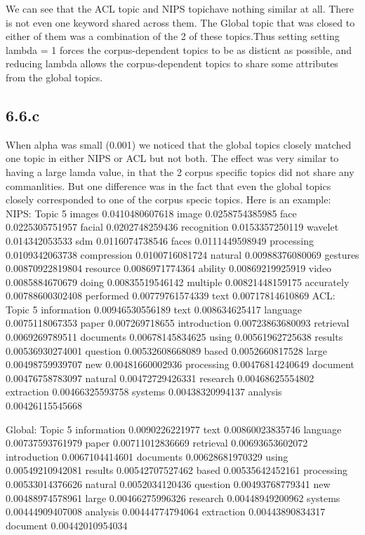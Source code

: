 \documentclass{article}
\begin{document}
We can see that the ACL topic and NIPS topichave nothing similar at all. There is not even one keyword shared across them. The Global topic that was closed to either of them was a combination of the 2 of these topics.Thus setting setting lambda = 1 forces the corpus-dependent topics to be as disticnt as possible, and reducing lambda allows the corpus-dependent topics to share some attributes from the global topics.

\subsection*{6.6.c}
When alpha was small (0.001) we noticed that the global topics closely matched one topic in either NIPS or ACL but not both.
The effect was very similar to having a large lamda value, in that the 2 corpus specific topics did not share any commanlities. But one difference was in the fact that even the global topics closely corresponded to one of the corpus specic topics. Here is an example:
NIPS:
Topic 5
images 0.0410480607618
image 0.0258754385985
face 0.0225305751957
facial 0.0202748259436
recognition 0.0153357250119
wavelet 0.014342053533
sdm 0.0116074738546
faces 0.0111449598949
processing 0.0109342063738
compression 0.0100716081724
natural 0.00988376080069
gestures 0.00870922819804
resource 0.0086971774364
ability 0.00869219925919
video 0.0085884670679
doing 0.00835519546142
multiple 0.00821448159175
accurately 0.00788600302408
performed 0.00779761574339
text 0.00717814610869
ACL:
Topic 5
information 0.00946530556189
text 0.008634625417
language 0.0075118067353
paper 0.007269718655
introduction 0.00723863680093
retrieval 0.0069269789511
documents 0.00678145834625
using 0.00561962725638
results 0.00536930274001
question 0.00532608668089
based 0.0052660817528
large 0.00498759939707
new 0.00481660002936
processing 0.00476814240649
document 0.00476758783097
natural 0.00472729426331
research 0.00468625554802
extraction 0.00466325593758
systems 0.00438320994137
analysis 0.00426115545668

Global:
Topic 5
information 0.0090226221977
text 0.00860023835746
language 0.00737593761979
paper 0.00711012836669
retrieval 0.00693653602072
introduction 0.0067104414601
documents 0.00628681970329
using 0.00549210942081
results 0.00542707527462
based 0.00535642452161
processing 0.00533014376626
natural 0.0052034120436
question 0.00493768779341
new 0.00488974578961
large 0.00466275996326
research 0.00448949200962
systems 0.00444909407008
analysis 0.00444774794064
extraction 0.00443890834317
document 0.00442010954034
\end{document}
